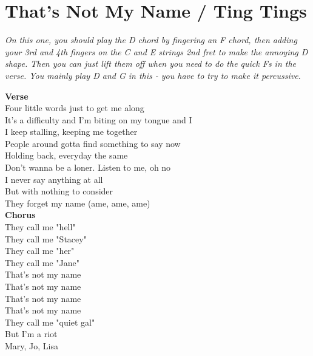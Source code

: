 \section{That's Not My Name / Ting Tings}\label{sec:thatsnotmyname}
\Dmajor
\Fmajor
\Gmajor
\Amajor

\emph{On this one, you should play the D chord by fingering an F chord, then adding your 3rd and 4th fingers on the C and E strings 2nd fret to make the annoying D shape. Then you can just lift them off when you need to do the quick Fs in the verse. You mainly play D and G in this - you have to try to make it percussive.}

\textbf{Verse}\\
Four little words just to get me along \\
It's a difficulty and I'm biting on my tongue and I\\
I keep stalling, keeping me together \\
People around gotta find something to say now \\
Holding back, everyday the same \\
Don't wanna be a loner. Listen to me, oh no \\
I never say anything at all \\
But with nothing to consider\\
They forget my name (ame, ame, ame) \\
\textbf{Chorus}\\
They call me "hell" \\
They call me "Stacey" \\
They call me "her" \\
They call me "Jane" \\
That's not my name\\
That's not my name \\
That's not my name\\
That's not my name \\
They call me "quiet gal"\\
But I'm a riot \\
Mary, Jo, Lisa \\
